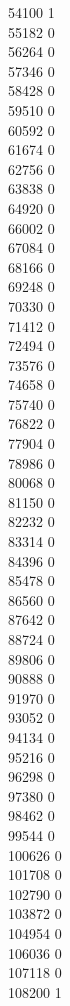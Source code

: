 { 54100	1 \\
 55182	0 \\
 56264	0 \\
 57346	0 \\
 58428	0 \\
 59510	0 \\
 60592	0 \\
 61674	0 \\
 62756	0 \\
 63838	0 \\
 64920	0 \\
 66002	0 \\
 67084	0 \\
 68166	0 \\
 69248	0 \\
 70330	0 \\
 71412	0 \\
 72494	0 \\
 73576	0 \\
 74658	0 \\
 75740	0 \\
 76822	0 \\
 77904	0 \\
 78986	0 \\
 80068	0 \\
 81150	0 \\
 82232	0 \\
 83314	0 \\
 84396	0 \\
 85478	0 \\
 86560	0 \\
 87642	0 \\
 88724	0 \\
 89806	0 \\
 90888	0 \\
 91970	0 \\
 93052	0 \\
 94134	0 \\
 95216	0 \\
 96298	0 \\
 97380	0 \\
 98462	0 \\
 99544	0 \\
 100626	0 \\
 101708	0 \\
 102790	0 \\
 103872	0 \\
 104954	0 \\
 106036	0 \\
 107118	0 \\
 108200	1 \\
}
